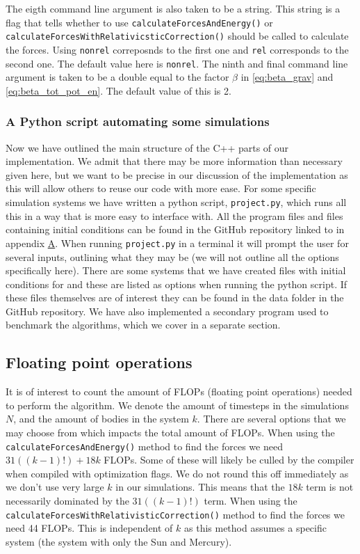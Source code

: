 \documentclass[reprint,english,notitlepage]{revtex4-1}  %
\begin{document}
The eigth command line argument is also taken to be a string. This string is a flag that tells whether to use \verb+calculateForcesAndEnergy()+ or \verb+calculateForcesWithRelativicsticCorrection()+ should be called to calculate the forces. Using \verb+nonrel+ correposnds to the first one and \verb+rel+ corresponds to the second one. The default value here is \verb+nonrel+. The ninth and final command line argument is taken to be a double equal to the factor $\beta$ in \eqref{eq:beta_grav} and \eqref{eq:beta_tot_pot_en}. The default value of this is 2. 


\subsubsection{A Python script automating some simulations} \label{sec:III:a:5}

Now we have outlined the main structure of the C++ parts of our implementation. We admit that there may be more information than necessary given here, but we want to be precise in our discussion of the implementation as this will allow others to reuse our code with more ease. For some specific simulation systems we have written a python script, \verb+project.py+, which runs all this in a way that is more easy to interface with. All the program files and files containing initial conditions can be found in the GitHub repository linked to in appendix \hyperref[A]{A}. When running \verb+project.py+ in a terminal it will prompt the user for several inputs, outlining what they may be (we will not outline all the options specifically here). There are some systems that we have created files with initial conditions for and these are listed as options when running the python script. If these files themselves are of interest they can be found in the data folder in the GitHub repository. We have also implemented a secondary program used to benchmark the algorithms, which we cover in a separate section.

\subsection{Floating point operations} \label{sec:III:b}

It is of interest to count the amount of FLOPs (floating point operations) needed to perform the algorithm. We denote the amount of timesteps in the simulations $N$, and the amount of bodies in the system $k$. There are several options that we may choose from which impacts the total amount of FLOPs. When using the \verb+calculateForcesAndEnergy()+ method to find the forces we need $31((k-1)!) + 18k$ FLOPs. Some of these will likely be culled by the compiler when compiled with optimization flags. We do not round this off immediately as we don't use very large $k$ in our simulations. This means that the $18k$ term is not necessarily dominated by the $31((k-1)!)$ term. When using the \verb+calculateForcesWithRelativisticCorrection()+ method to find the forces we need 44 FLOPs. This is independent of $k$ as this method assumes a specific system (the system with only the Sun and Mercury). 
\end{document}
